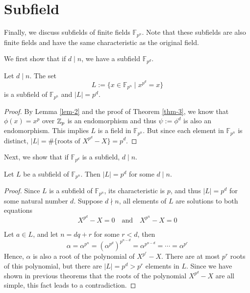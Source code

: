 \section{Subfield}

Finally, we discuss subfields of finite fields $\mathbb{F}_{p^n}$. Note that these subfields are also finite fields and have the same characteristic as the original field.

We first show that if $d \mid n$, we have a subfield $\mathbb{F}_{p^d}$.

\begin{theorem}
\label{thm-7}
Let $d \mid n$. The set
\[
	L := \{x \in \mathbb{F}_{p^n} \mid x^{p^d} = x\}
\]
is a subfield of $\mathbb{F}_{p^n}$ and $|L| = p^d$.
\end{theorem}

\begin{proof}

By Lemma \ref{lem-2} and the proof of Theorem \ref{thm-3}, we know that $\phi(x) = x^p$ over $\mathbb{Z}_p$ is an endomorphism and thus $\psi := \phi^d$ is also an endomorphism. This implies $L$ is a field in $\mathbb{F}_{p^n}$. But since each element in $\mathbb{F}_{p^n}$ is distinct, $|L| = \#\{\text{roots of } X^{p^d} - X\} =  p^d$.

\end{proof}

Next, we show that if $\mathbb{F}_{p^d}$ is a subfield, $d \mid n$.

\begin{theorem}
\label{thm-8}
Let $L$ be a subfield of $\mathbb{F}_{p^n}$. Then $|L| = p^d$ for some $d \mid n$.

\end{theorem}

\begin{proof}

Since $L$ is a subfield of $\mathbb{F}_{p^n}$, its characteristic is $p$, and thus $|L| = p^d$ for some natural number $d$. Suppose $d \nmid n$, all elements of $L$ are solutions to both equations
\[
	X^{p^d} - X = 0 \quad \text{and} \quad X^{p^n} - X = 0
\]

Let $a\in L$, and let $n = dq + r$ for some $r < d$, then
\[
	\alpha = \alpha^{p^n} = (\alpha^{p^d})^{p^{n-d}} = \alpha^{p^{n-d}} = \cdots = \alpha^{p^{r}}
\]
Hence, $\alpha$ is also a root of the polynomial of $X^{p^r} - X$. There are at most $p^r$ roots of this polynomial, but there are $|L| = p^d > p^r$ elements in $L$. Since we have shown in previous theorems that the roots of the polynomial $X^{p^d} - X$ are all simple, this fact leads to a contradiction.

\end{proof}


